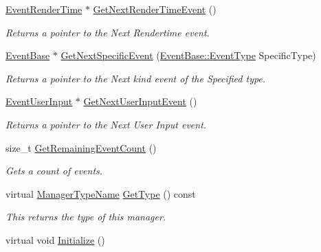 \begin{DoxyCompactItemize}
\hyperlink{classMezzanine_1_1EventRenderTime}{EventRenderTime} $\ast$ \hyperlink{classMezzanine_1_1EventManager_a9a1d195b08d34de39cbd72f95ab01190}{GetNextRenderTimeEvent} ()
\begin{DoxyCompactList}\small\item\em Returns a pointer to the Next Rendertime event. \item\end{DoxyCompactList}\item 
\hyperlink{classMezzanine_1_1EventBase}{EventBase} $\ast$ \hyperlink{classMezzanine_1_1EventManager_a1ef3a915c26ab96fa6958a9e80c8aaaa}{GetNextSpecificEvent} (\hyperlink{classMezzanine_1_1EventBase_ab85e31e97753b7e7ecb098f82526baef}{EventBase::EventType} SpecificType)
\begin{DoxyCompactList}\small\item\em Returns a pointer to the Next kind event of the Specified type. \item\end{DoxyCompactList}\item 
\hyperlink{classMezzanine_1_1EventUserInput}{EventUserInput} $\ast$ \hyperlink{classMezzanine_1_1EventManager_a8d1af0c4bcb070edb8d013e1cf9ebf34}{GetNextUserInputEvent} ()
\begin{DoxyCompactList}\small\item\em Returns a pointer to the Next User Input event. \item\end{DoxyCompactList}\item 
size\_\-t \hyperlink{classMezzanine_1_1EventManager_aa3f1b41578307c7ac801340b275af027}{GetRemainingEventCount} ()
\begin{DoxyCompactList}\small\item\em Gets a count of events. \item\end{DoxyCompactList}\item 
virtual \hyperlink{classMezzanine_1_1ManagerBase_a08cecf5169cad3e82be81a3a159b0b6e}{ManagerTypeName} \hyperlink{classMezzanine_1_1EventManager_a6e4c72bcaa437863fdf167b5b9ef5034}{GetType} () const 
\begin{DoxyCompactList}\small\item\em This returns the type of this manager. \item\end{DoxyCompactList}\item 
virtual void \hyperlink{classMezzanine_1_1EventManager_a2bf1969aadd0fb5a3da284423e44b081}{Initialize} ()

\end{DoxyCompactItemize}
